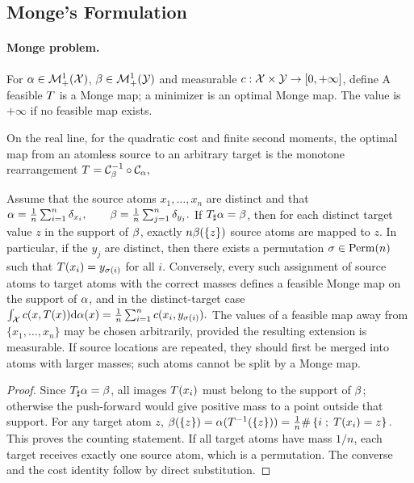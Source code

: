 \subsection{Monge's Formulation}
\label{sec-monge-formulation}
\label{sec-continuous-monge}
\paragraph{Monge problem.}
\begin{defn}\label{def-monge-problem}
For $\alpha\in\mathcal{M}_+^1(\mathcal{X})$, $\beta\in\mathcal{M}_+^1(\mathcal{Y})$ and measurable $c:\mathcal{X}\times\mathcal{Y}\to[0,+\infty]$, define
A feasible $T$ is a Monge map; a minimizer is an optimal Monge map. The value is $+\infty$ if no feasible map exists.
\end{defn}
On the real line, for the quadratic cost and finite second moments, the optimal map from an atomless source to an arbitrary target is the monotone rearrangement
\(T=\mathcal{C}_{\beta}^{-1}\circ\mathcal{C}_{\alpha},\)
\begin{prop}\label{prop-empirical-monge-matching}
Assume that the source atoms $x_1,\ldots,x_n$ are distinct and that
\(\alpha=\frac1n\sum_{i=1}^n\delta_{x_i}, \qquad \beta=\frac1n\sum_{j=1}^n\delta_{y_j}.\)
If $T_\sharp\alpha=\beta$, then for each distinct target value $z$ in the support of $\beta$, exactly $n\beta(\{z\})$ source atoms are mapped to $z$. In particular, if the $y_j$ are distinct, then there exists a permutation $\sigma\in\mathrm{Perm}(n)$ such that $T(x_i)=y_{\sigma(i)}$ for all $i$. Conversely, every such assignment of source atoms to target atoms with the correct masses defines a feasible Monge map on the support of $\alpha$, and in the distinct-target case
\(\int_{\mathcal{X}} c(x,T(x))\mathrm{d}\alpha(x)=\frac1n\sum_{i=1}^n c(x_i,y_{\sigma(i)}).\)
The values of a feasible map away from $\{x_1,\ldots,x_n\}$ may be chosen arbitrarily, provided the resulting extension is measurable. If source locations are repeated, they should first be merged into atoms with larger masses; such atoms cannot be split by a Monge map.
\end{prop}
\begin{proof}
Since $T_\sharp\alpha=\beta$, all images $T(x_i)$ must belong to the support of $\beta$; otherwise the push-forward would give positive mass to a point outside that support. For any target atom $z$,
\(\beta(\{z\})=\alpha(T^{-1}(\{z\}))=\frac1n\#\left\{ i \;;\; T(x_i)=z \right\}.\)
This proves the counting statement. If all target atoms have mass $1/n$, each target receives exactly one source atom, which is a permutation. The converse and the cost identity follow by direct substitution.
\end{proof}

